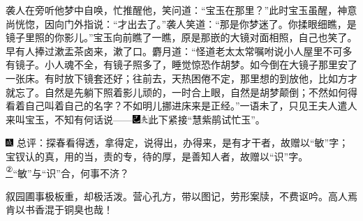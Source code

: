 袭人在旁听他梦中自唤，忙推醒他，笑问道：``宝玉在那里？''此时宝玉虽醒，神意尚恍惚，因向门外指说：``才出去了。''袭人笑道：``那是你梦迷了。你揉眼细瞧，是镜子里照的你影儿。''宝玉向前瞧了一瞧，原是那嵌的大镜对面相照，自己也笑了。早有人捧过漱盂茶卤来，漱了口。麝月道：``怪道老太太常嘱咐说小人屋里不可多有镜子。小人魂不全，有镜子照多了，睡觉惊恐作胡梦。如今倒在大镜子那里安了一张床。有时放下镜套还好；往前去，天热困倦不定，那里想的到放他，比如方才就忘了。自然是先躺下照着影儿顽的，一时合上眼，自然是胡梦颠倒；不然如何得看着自己叫着自己的名字？不如明儿挪进床来是正经。''一语未了，只见王夫人遣人来叫宝玉，不知有何话说------{\includegraphics[width=3mm]{../Images/00003}\includegraphics[width=3mm]{../Images/00012}\footnotesize \kaishu 此下紧接``慧紫鹃试忙玉''。}

{\includegraphics[width=3mm]{../Images/00005}  \kaishu 总评：探春看得透，拿得定，说得出，办得来，是有才干者，故赠以``敏''字；宝钗认的真，用的当，责的专，待的厚，是善知人者，故赠以``识''字。}\href{../Text/part0060_split_000.html\#lnkback_2_a}{\textsuperscript{②}}{``敏''与``识''合，何事不济？}

{叙园圃事极板重，却极活泼。营心孔方，带以图记，劳形案牍，不费讴吟。高人焉肯以书香混于铜臭也哉！}


